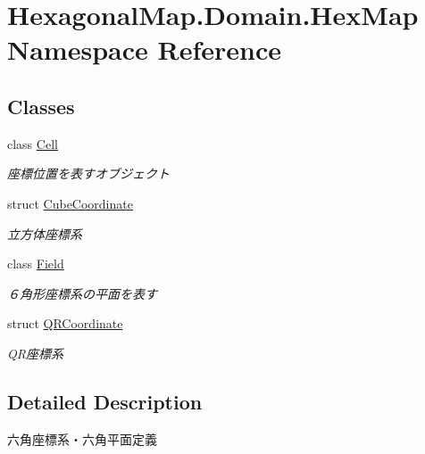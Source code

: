 \hypertarget{namespace_hexagonal_map_1_1_domain_1_1_hex_map}{}\section{Hexagonal\+Map.\+Domain.\+Hex\+Map Namespace Reference}
\label{namespace_hexagonal_map_1_1_domain_1_1_hex_map}
\subsection*{Classes}
\begin{DoxyCompactItemize}
\item 
class \mbox{\hyperlink{class_hexagonal_map_1_1_domain_1_1_hex_map_1_1_cell}{Cell}}
\begin{DoxyCompactList}\small\item\em 座標位置を表すオブジェクト \end{DoxyCompactList}\item 
struct \mbox{\hyperlink{struct_hexagonal_map_1_1_domain_1_1_hex_map_1_1_cube_coordinate}{Cube\+Coordinate}}
\begin{DoxyCompactList}\small\item\em 立方体座標系 \end{DoxyCompactList}\item 
class \mbox{\hyperlink{class_hexagonal_map_1_1_domain_1_1_hex_map_1_1_field}{Field}}
\begin{DoxyCompactList}\small\item\em ６角形座標系の平面を表す \end{DoxyCompactList}\item 
struct \mbox{\hyperlink{struct_hexagonal_map_1_1_domain_1_1_hex_map_1_1_q_r_coordinate}{Q\+R\+Coordinate}}
\begin{DoxyCompactList}\small\item\em Q\+R座標系 \end{DoxyCompactList}\end{DoxyCompactItemize}


\subsection{Detailed Description}
六角座標系・六角平面定義 